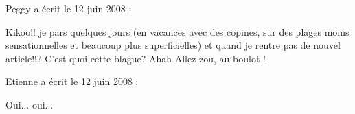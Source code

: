 \medskip
Peggy a écrit le 12 juin 2008 :
\begin{displayquote}
Kikoo!! je pars quelques jours (en vacances avec des copines, sur des plages moins sensationnelles et beaucoup plus superficielles) et quand je rentre pas de nouvel article!!?
C'est quoi cette blague? Ahah
Allez zou, au boulot !
\end{displayquote}

\medskip
Etienne a écrit le 12 juin 2008 :
\begin{displayquote}
Oui... oui...
\end{displayquote}

\vfill
